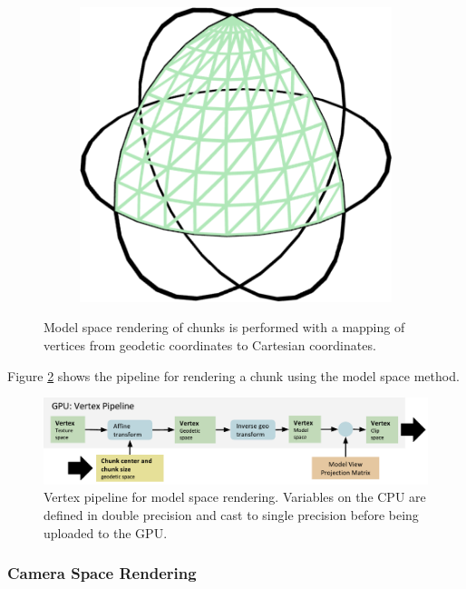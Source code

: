 \begin{figure}[htbp]
\begin{subfigure}[tb]{0.2\textwidth}
    	\includegraphics[width=\textwidth]{figures/implementation/rendering/gridonglobe.png}
    \end{subfigure}
    \caption{Model space rendering of chunks is performed with a mapping of vertices from geodetic coordinates to Cartesian coordinates.}
    \label{fig:global}
\end{figure}

Figure \ref{fig:pipelineglobal} shows the pipeline for rendering a chunk using the model space method.

\begin{figure}[htbp]
    \centering
    \includegraphics[width=\textwidth]{figures/implementation/rendering/pipeline_global.pdf}
    \caption{Vertex pipeline for model space rendering. Variables on the CPU are defined in double precision and cast to single precision before being uploaded to the GPU.}
    \label{fig:pipelineglobal}
\end{figure}

\subsubsection{Camera Space Rendering}

